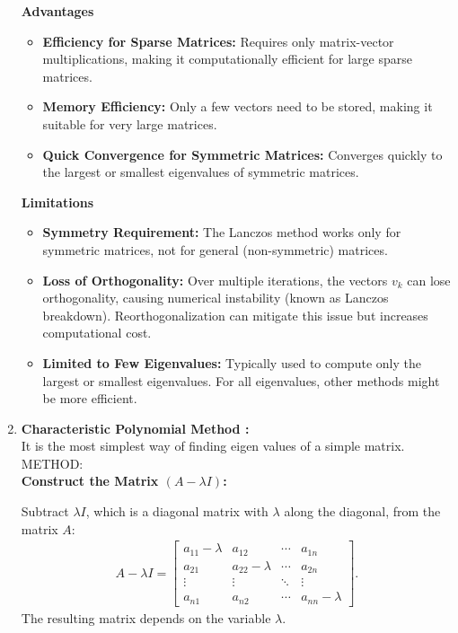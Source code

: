 \documentclass[journal]{IEEEtran}
\begin{document}
\begin{enumerate}
\textbf{Advantages}
\begin{itemize}
    \item \textbf{Efficiency for Sparse Matrices:} Requires only matrix-vector multiplications, making it computationally efficient for large sparse matrices.
    \item \textbf{Memory Efficiency:} Only a few vectors need to be stored, making it suitable for very large matrices.
    \item \textbf{Quick Convergence for Symmetric Matrices:} Converges quickly to the largest or smallest eigenvalues of symmetric matrices.
\end{itemize}

\textbf{Limitations}
\begin{itemize}
    \item \textbf{Symmetry Requirement:} The Lanczos method works only for symmetric matrices, not for general (non-symmetric) matrices.
    \item \textbf{Loss of Orthogonality:} Over multiple iterations, the vectors $v_k$ can lose orthogonality, causing numerical instability (known as Lanczos breakdown). Reorthogonalization can mitigate this issue but increases computational cost.
    \item \textbf{Limited to Few Eigenvalues:} Typically used to compute only the largest or smallest eigenvalues. For all eigenvalues, other methods might be more efficient.
\end{itemize}

\item \textbf{Characteristic Polynomial Method :} \\
It is the most simplest way of finding eigen values of a simple matrix.\\
METHOD: \\
\textbf{Construct the Matrix $(A - \lambda I)$:}

Subtract $\lambda I$, which is a diagonal matrix with $\lambda$ along the diagonal, from the matrix $A$:
\begin{align}
A - \lambda I = 
\begin{bmatrix}
a_{11} - \lambda & a_{12} & \cdots & a_{1n} \\
a_{21} & a_{22} - \lambda & \cdots & a_{2n} \\
\vdots & \vdots & \ddots & \vdots \\
a_{n1} & a_{n2} & \cdots & a_{nn} - \lambda
\end{bmatrix}.
\end{align}
The resulting matrix depends on the variable $\lambda$.


\end{enumerate}
\end{document}
